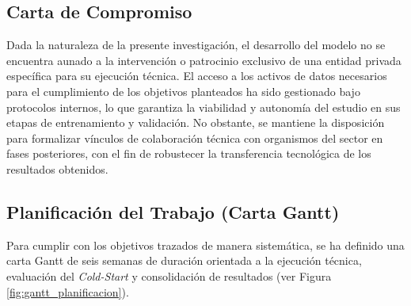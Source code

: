 \subsection{Carta de Compromiso}
Dada la naturaleza de la presente investigación, el desarrollo del modelo no se encuentra aunado a la intervención o patrocinio exclusivo de una entidad privada específica para su ejecución técnica. El acceso a los activos de datos necesarios para el cumplimiento de los objetivos planteados ha sido gestionado bajo protocolos internos, lo que garantiza la viabilidad y autonomía del estudio en sus etapas de entrenamiento y validación. No obstante, se mantiene la disposición para formalizar vínculos de colaboración técnica con organismos del sector en fases posteriores, con el fin de robustecer la transferencia tecnológica de los resultados obtenidos.

\newpage

\subsection{Planificación del Trabajo (Carta Gantt)}
Para cumplir con los objetivos trazados de manera sistemática, se ha definido una carta Gantt de seis semanas de duración orientada a la ejecución técnica, evaluación del \textit{Cold-Start} y consolidación de resultados (ver Figura \ref{fig:gantt_planificacion}).


